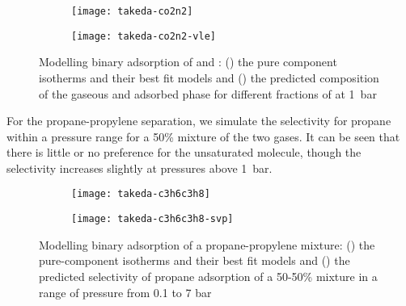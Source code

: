 \begin{figure}[h]

    \centering
    \begin{subfigure}[b]{.5\textwidth}
        \centering
        \texttt{[image: takeda-co2n2]}
        \caption{}%
        \label{fig:takedaco2n2iso}
    \end{subfigure}%
    \begin{subfigure}[b]{.5\textwidth}
        \centering
        \texttt{[image: takeda-co2n2-vle]}
        \caption{}%
        \label{fig:takedaco2n2iast}
    \end{subfigure}
    \caption{Modelling binary adsorption of  and : 
    (\protect{}) the pure component
    isotherms and their best fit models and (\protect{}) 
    the predicted composition of the gaseous
    and adsorbed phase for different fractions of  at \SI{1}{\bar}}%
    \label{fig:takedaco2n2}

\end{figure}

For the propane-propylene separation, we simulate the selectivity for propane
within a pressure range for a 50\% mixture of the two gases. It can be seen that
there is little or no preference for the unsaturated molecule, though the selectivity
increases slightly at pressures above \SI{1}{\bar}.

\begin{figure}[ht]

    \centering
    \begin{subfigure}[b]{.49\textwidth}
        \centering
        \texttt{[image: takeda-c3h6c3h8]}
        \caption{}%
        \label{fig:takedac3h6c3h8iso}
    \end{subfigure}
    \begin{subfigure}[b]{.49\textwidth}
        \centering
        \texttt{[image: takeda-c3h6c3h8-svp]}
        \caption{}%
        \label{fig:takedac3h6c3h8iast}
    \end{subfigure}
    \caption{Modelling binary adsorption of a propane-propylene mixture: 
    (\protect{}) the pure-component
    isotherms and their best fit models and (\protect{})
    the predicted selectivity of propane adsorption of a 50-50\% mixture in a range of 
    pressure from 0.1 to 7 bar}%
    \label{fig:takedac3h6c3h8}

\end{figure}